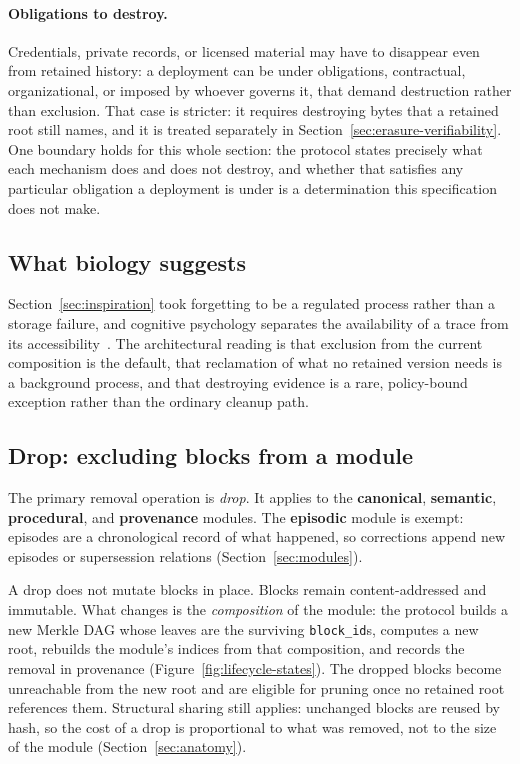 \documentclass[11pt,a4paper]{article}
\begin{document}
\paragraph{Obligations to destroy.} Credentials, private records, or licensed
material may have to disappear even from retained history: a deployment can be
under obligations, contractual, organizational, or imposed by whoever governs
it, that demand destruction rather than exclusion. That case is stricter: it
requires destroying bytes that a retained root still names, and it is treated
separately in Section~\ref{sec:erasure-verifiability}. One boundary holds for
this whole section: the protocol states precisely what each mechanism does and
does not destroy, and whether that satisfies any particular obligation a
deployment is under is a determination this specification does not make.

\subsection{What biology suggests}

Section~\ref{sec:inspiration} took forgetting to be a regulated process rather
than a storage failure, and cognitive psychology separates the availability of
a trace from its accessibility~\cite{bjork1992disuse}. The architectural
reading is that exclusion from the current composition is the default, that
reclamation of what no retained version needs is a background process, and
that destroying evidence is a rare, policy-bound exception rather than the
ordinary cleanup path.

\subsection{Drop: excluding blocks from a module}
\label{sec:drop}

The primary removal operation is \emph{drop}. It applies to the
\textbf{canonical}, \textbf{semantic}, \textbf{procedural}, and
\textbf{provenance} modules. The \textbf{episodic} module is exempt: episodes
are a chronological record of what happened, so corrections append new episodes or supersession relations
(Section~\ref{sec:modules}).

A drop does not mutate blocks in place. Blocks remain content-addressed and
immutable. What changes is the \emph{composition} of the module: the protocol
builds a new Merkle DAG whose leaves are the surviving
\texttt{block\_id}s, computes a new root, rebuilds the module's indices from
that composition, and records the removal in provenance
(Figure~\ref{fig:lifecycle-states}). The dropped blocks become unreachable from
the new root and are eligible for pruning once no retained root references
them. Structural sharing still applies: unchanged blocks are reused by hash, so
the cost of a drop is proportional to what was removed, not to the size of the
module (Section~\ref{sec:anatomy}).
\end{document}

